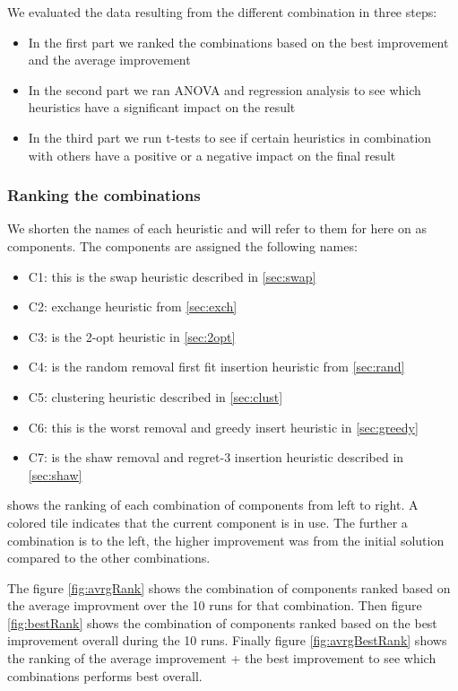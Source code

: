 \documentclass[../main.tex]{subfiles}
\begin{document}
\par We evaluated the data resulting from the different combination in three steps:
\begin{itemize}
    \item In the first part we ranked the combinations based on the best improvement and the average improvement
    \item In the second part we ran ANOVA and regression analysis to see which heuristics have a significant impact on the result
    \item In the third part we run t-tests to see if certain heuristics in combination with others have a positive or a negative impact on the final result
\end{itemize}

\subsubsection{Ranking the combinations}
We shorten the names of each heuristic and will refer to them for here on as components. The components are assigned the following names:
\begin{itemize}
    \item C1: this is the swap heuristic described in \cref{sec:swap}
    \item C2: exchange heuristic from \cref{sec:exch}
    \item C3: is the 2-opt heuristic in \cref{sec:2opt} 
    \item C4: is the random removal first fit insertion heuristic from \cref{sec:rand}
    \item C5: clustering heuristic described in \cref{sec:clust}
    \item C6: this is the worst removal and greedy insert heuristic in \cref{sec:greedy}
    \item C7: is the shaw removal and regret-3 insertion heuristic described in \cref{sec:shaw}
\end{itemize}

 shows the ranking of each combination of components from left to right.
A colored tile indicates that the current component is in use.
The further a combination is to the left, the higher improvement was from the initial solution compared to the other combinations. \par
The figure \ref{fig:avrgRank} shows the combination of components ranked based on the average improvment over the 10 runs for that combination.
Then figure \ref{fig:bestRank} shows the combination of components ranked based on the best improvement overall during the 10 runs.
Finally figure \ref{fig:avrgBestRank} shows the ranking of the average improvement + the best improvement to see which combinations performs best overall.
\end{document}
